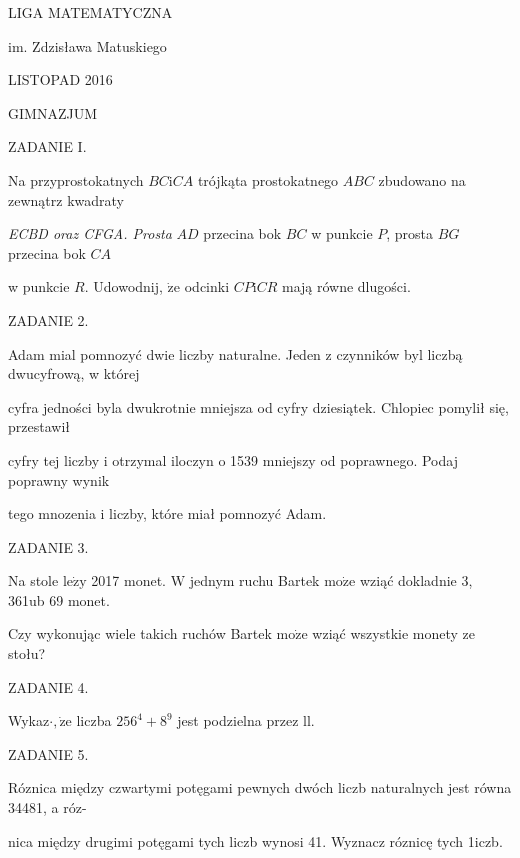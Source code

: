 \documentclass[a4paper,12pt]{article}
\begin{document}
LIGA MATEMATYCZNA

im. Zdzisława Matuskiego

LISTOPAD 2016

GIMNAZJUM

ZADANIE I.

Na przyprostokatnych $BC\mathrm{i}CA$ trójkąta prostokatnego $ABC$ zbudowano na zewnątrz kwadraty

{\it ECBD oraz CFGA. Prosta} $AD$ przecina bok $BC$ w punkcie $P$, prosta $BG$ przecina bok $CA$

w punkcie $R$. Udowodnij, $\dot{\mathrm{z}}\mathrm{e}$ odcinki $CP\mathrm{i}CR$ mają równe dlugości.

ZADANIE 2.

Adam mial pomnozyć dwie liczby naturalne. Jeden z czynników byl liczbą dwucyfrową, w której

cyfra jedności byla dwukrotnie mniejsza od cyfry dziesiątek. Chlopiec pomylił się, przestawił

cyfry tej liczby i otrzymal iloczyn o 1539 mniejszy od poprawnego. Podaj poprawny wynik

tego mnozenia i liczby, które miał pomnozyć Adam.

ZADANIE 3.

Na stole $\mathrm{l}\mathrm{e}\dot{\mathrm{z}}\mathrm{y}$ 2017 monet. $\mathrm{W}$ jednym ruchu Bartek $\mathrm{m}\mathrm{o}\dot{\mathrm{z}}\mathrm{e}$ wziąć dokladnie 3, 361ub 69 monet.

Czy wykonując wiele takich ruchów Bartek $\mathrm{m}\mathrm{o}\dot{\mathrm{z}}\mathrm{e}$ wziąć wszystkie monety ze stołu?

ZADANIE 4.

Wykaz$\cdot, \dot{\mathrm{z}}\mathrm{e}$ liczba $256^{4}+8^{9}$ jest podzielna przez ll.

ZADANIE 5.

Róznica między czwartymi potęgami pewnych dwóch liczb naturalnych jest równa 34481, a róz-

nica między drugimi potęgami tych liczb wynosi 41. Wyznacz róznicę tych 1iczb.
\end{document}
